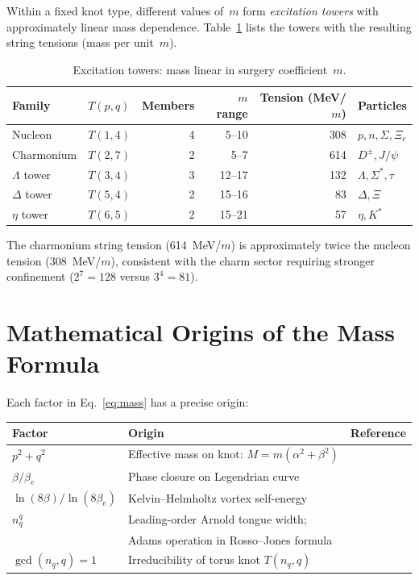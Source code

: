 \documentclass[11pt,a4paper]{article}
\begin{document}
Within a fixed knot type, different values of~$m$ form
\emph{excitation towers} with approximately linear mass
dependence.  Table~\ref{tab:towers} lists the towers
with the resulting string tensions (mass per unit~$m$).

\begin{table}[H]
\centering
\caption{Excitation towers: mass linear in surgery coefficient~$m$.}
\label{tab:towers}
\begin{tabular}{llrrrl}
\toprule
Family & $T(p,q)$ & Members & $m$ range & Tension (MeV/$m$) & Particles \\
\midrule
Nucleon    & $T(1,4)$ & 4 & 5--10  & 308 & $p, n, \Sigma, \Xi_c$ \\
Charmonium & $T(2,7)$ & 2 & 5--7   & 614 & $D^\pm, J/\psi$ \\
$\Lambda$ tower & $T(3,4)$ & 3 & 12--17 & 132 & $\Lambda, \Sigma^*, \tau$ \\
$\Delta$ tower  & $T(5,4)$ & 2 & 15--16 &  83 & $\Delta, \Xi$ \\
$\eta$ tower    & $T(6,5)$ & 2 & 15--21 &  57 & $\eta, K^*$ \\
\bottomrule
\end{tabular}
\end{table}

The charmonium string tension (614~MeV/$m$) is approximately
twice the nucleon tension (308~MeV/$m$), consistent with the
charm sector requiring stronger confinement ($2^7 = 128$ versus
$3^4 = 81$).


\section{Mathematical Origins of the Mass Formula}
\label{sec:math}

Each factor in Eq.~\eqref{eq:mass} has a precise origin:

\begin{center}
\begin{tabular}{lll}
\toprule
Factor & Origin & Reference \\
\midrule
$p^2 + q^2$ & Effective mass on knot: $M = m(\alpha^2 + \beta^2)$ &
  \cite{Sreedhar2015} \\
$\beta/\beta_e$ & Phase closure on Legendrian curve &
  \cite{paper5} \\
$\ln(8\beta)/\ln(8\beta_e)$ & Kelvin--Helmholtz vortex self-energy &
  \cite{Donnelly} \\
$n_q^q$ & Leading-order Arnold tongue width; &
  \cite{RossoJones1993} \\
 & Adams operation in Rosso--Jones formula & \\
$\gcd(n_q,q) = 1$ & Irreducibility of torus knot $T(n_q, q)$ &
  \cite{paper4} \\
\bottomrule
\end{tabular}
\end{center}
\end{document}
